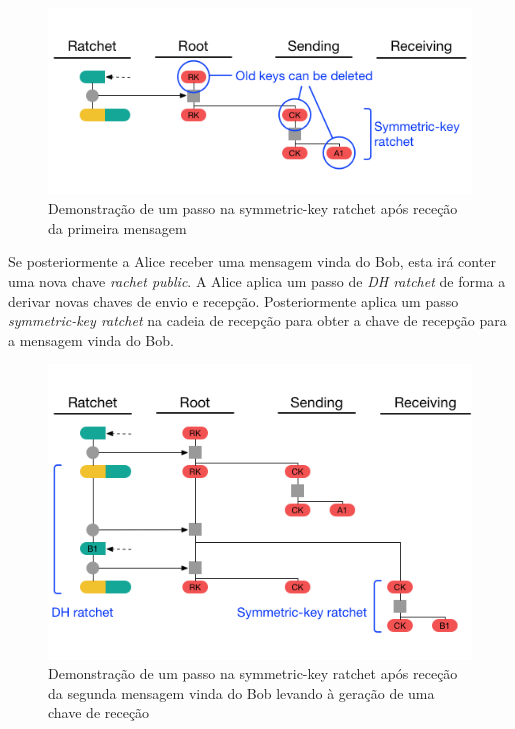 \begin{figure}[H]
\begin{center}
\includegraphics[width=12cm]{img/DR2.png}
\caption{Demonstração de um passo na symmetric-key ratchet após receção da primeira mensagem}
\label{diagram:DR2} 
\centering
\end{center}
\end{figure}

Se posteriormente a Alice receber uma mensagem vinda do Bob, esta irá conter uma nova chave \textit{rachet public}. A Alice aplica um passo de \textit{DH ratchet} de forma a derivar novas chaves de envio e recepção. Posteriormente aplica um passo \textit{symmetric-key ratchet} na cadeia de recepção para obter a chave de recepção para a mensagem vinda do Bob.

\begin{figure}[H]
\begin{center}
\includegraphics[width=12cm]{img/DR3.png}
\caption{Demonstração de um passo na symmetric-key ratchet após receção da segunda mensagem vinda do Bob levando à geração de uma chave de receção}
\label{diagram:DR3} 
\centering
\end{center}
\end{figure}

